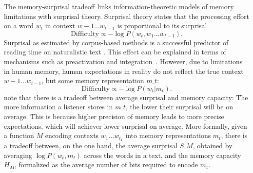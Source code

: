 \documentclass[11pt,letterpaper]{article}
\begin{document}
The memory-surprisal tradeoff links information-theoretic models of memory limitations with surprisal theory.
Surprisal theory \citep{hale2001probabilistic, levy2008expectation} states that the processing effort on a word $w_t$ in context $w-1 ... w_{t-1}$ is proportional to its surprisal
     \begin{equation}   \label{eq:true-surp}
    \text{Difficulty} \propto -\log P(w_t , w_1\dots w_{t-1}).
\end{equation}
Surprisal as estimated by corpus-based methods is a successful predictor of reading time on naturalistic text \citep{smith2013effect,goodkind-predictive-2018,frank2019interaction,aurnhammer2019evaluating,wilcox2020predictive}.
This effect can be explained in terms of mechanisms such as preactivation and integration~\citep{kuperberg2016we}.
However, due to limitations in human memory, human expectations in reality do not reflect the true context $w-1\dots w_{t-1}$, but some memory representation $m\_t$:
\begin{equation}   \label{eq:lossy-surp}
    \text{Difficulty} \propto -\log P(w_t | m_t).
\end{equation}
\citet{Hahn2020modeling} note that there is a tradeoff between average surprisal and memory capacity:
The more information a listener stores in $m\_t$, the lower their surprisal will be on average.
This is because higher precision of memory leads to more precise expectations, which will achiever lower surprisal on average.
More formally, given a function $M$ encoding contexts $w_1\dots w_{t_1}$ into memory representations $m_t$, there is a tradeoff between, on the one hand, the average surprisal $S\_M$, obtained by averaging $\log P(w_t , m_t)$ across the words in a text, and the memory capacity $H_M$, formalized as the average number of bits required to encode $m_t$.
\end{document}
